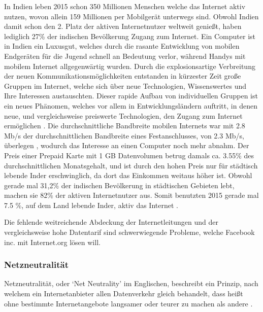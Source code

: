 \documentclass{article}
\begin{document}
In Indien leben 2015 schon 350 Millionen Menschen welche das Internet aktiv nutzen\autocite{slideshareIndia}, wovon allein 159 Millionen per Mobilgerät unterwegs sind.
Obwohl Indien damit schon den 2. Platz der aktiven Internetnutzer weltweit genießt, haben lediglich 27\% der indischen Bevölkerung Zugang zum Internet\autocite{InternetCountry}.
\medskip 
Ein Computer ist in Indien ein Luxusgut, welches durch die rasante Entwicklung von mobilen Endgeräten für die Jugend schnell an Bedeutung verlor, während Handys mit mobilem Internet allgegenwärtig wurden.
Durch die explosionsartige Verbreitung der neuen Kommunikationsmöglichkeiten entstanden in kürzester Zeit große Gruppen im Internet, welche sich über neue Technologien, Wissenswertes und Ihre Interessen austauschten.
Dieser rapide Aufbau von individuellen Gruppen ist ein neues Phänomen, welches vor allem in Entwicklungsländern auftritt, in denen neue, und vergleichsweise preiswerte Technologien, den Zugang zum Internet ermöglichen \textcite{empowermentThroughFacebook}.
\medskip
Die durchschnittliche Bandbreite mobilen Internets war mit 2.8 Mb/s der durchschnittlichen Bandbreite eines Festanschlusses, von 2.3 Mb/s, überlegen \autocite{slideshareIndia}, wodurch das Interesse an einen Computer noch mehr abnahm.
Der Preis einer Prepaid Karte mit 1 GB Datenvolumen betrug damals ca. 3.55\% des durchschnittlichen Monatsgehalt\autocite{broadbandAgency}, und ist durch den hohen Preis nur für städtisch lebende Inder erschwinglich, da dort das Einkommen weitaus höher ist.
Obwohl gerade mal 31,2\% der indischen Bevölkerung in städtischen Gebieten lebt, machen sie 82\% der aktiven Internetnutzer aus\autocite{IndiaBevölkerung}.
Somit benutzten 2015 gerade mal 7.5 \%, auf dem Land lebende Inder, aktiv das Internet \autocite{slideshareIndia}.

Die fehlende weitreichende Abdeckung der Internetleitungen und der vergleichsweise hohe Datentarif sind schwerwiegende Probleme, welche Facebook inc. mit Internet.org lösen will.

\subsubsection{Netzneutralität} \label{netzneutralität}

Netzneutralität, oder `Net Neutrality' im Englischen, beschreibt ein Prinzip, nach welchem ein Internetanbieter allen Datenverkehr gleich behandelt, dass heißt ohne bestimmte Internetangebote langsamer oder teurer zu machen als andere \autocite{netzneutralität}.
\end{document}
